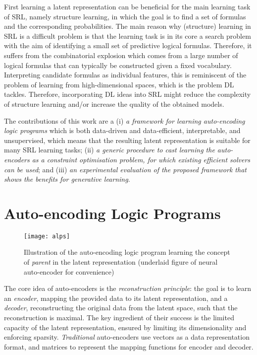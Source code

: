 First learning a latent representation can be beneficial for the main learning task of SRL, namely structure learning, in which the goal is to find a set of formulas and the corresponding probabilities. 
The main reason why (structure) learning in SRL is a difficult problem is that the learning task is in its core a search problem with the aim of identifying a small set of predictive logical formulas.
Therefore, it suffers from the combinatorial explosion which comes from a large number of logical formulas that can typically be constructed given a fixed vocabulary.
Interpreting candidate formulas as individual features, this is reminiscent of the problem of learning from high-dimensional spaces, which is the problem DL tackles.
Therefore, incorporating DL ideas into SRL might reduce the complexity of structure learning and/or increase the quality of the obtained models.


The contributions of this work are a (i) \textit{a framework for learning auto-encoding logic programs} which is both data-driven and data-efficient, interpretable, and unsupervised, which means that the resulting latent representation is suitable for many SRL learning tasks; (ii) \textit{a generic procedure to cast learning the auto-encoders as a constraint optimisation problem, for which existing efficient solvers can be used}; and (iii) \textit{an experimental evaluation of the proposed framework that shows the benefits for generative learning}.





\section{Auto-encoding Logic Programs}

\begin{figure*}
	\centering
    \texttt{[image: alps]}
    \caption{Illustration of the auto-encoding logic program learning the concept of \textit{parent} in the latent representation (underlaid figure of neural auto-encoder for convenience)\label{fig:alp}}
\end{figure*}



The core idea of auto-encoders is the \textit{reconstruction principle}: the goal is to learn an \textit{encoder}, mapping the provided data to its latent representation, and a \textit{decoder}, reconstructing the original data from the latent space, such that the reconstruction is maximal.
The key ingredient of their success is the limited capacity of the latent representation, ensured by limiting its dimensionality and enforcing sparsity.
\textit{Traditional} auto-encoders use vectors as a data representation format, and matrices to represent the mapping functions for encoder and decoder.


